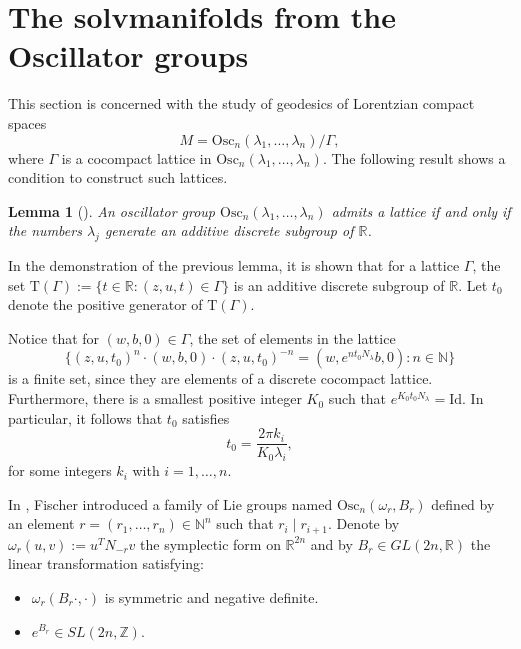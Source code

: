 \documentclass[12pt]{amsart}
\theoremstyle{plain}
\newtheorem{lem}[thm]{Lemma}
\theoremstyle{definition}
\theoremstyle{remark}
\begin{document}
	

	
\section{The solvmanifolds from the Oscillator groups}\label{sectionosc}

This section is concerned with the study of geodesics of Lorentzian compact spaces 
\[
M = \text{Osc}_n(\lambda_1, \ldots, \lambda_n) / \Gamma,
\]
where \( \Gamma \) is a cocompact lattice in \( \text{Osc}_n(\lambda_1, \ldots, \lambda_n) \). The following result shows a condition to construct such lattices.

\begin{lem}[\cite{MeRe}]\label{lema_medina}
    An oscillator group \( \text{Osc}_n(\lambda_1, \ldots, \lambda_n) \) admits a lattice if and only if the numbers \( \lambda_j \) generate an additive discrete subgroup of \( \mathbb{R} \).
\end{lem}

In the demonstration of the previous lemma, it is shown that for a lattice \( \Gamma \), the set \( \mathrm{T}(\Gamma) := \{ t \in \mathbb{R} : (z,u,t) \in \Gamma \} \) is an additive discrete subgroup of \( \mathbb{R} \). Let \( t_0 \) denote the positive generator of \( \mathrm{T}(\Gamma) \).

Notice that for \( (w,b,0) \in \Gamma \), the set of elements in the lattice
\[
\{ (z,u,t_0)^n \cdot (w,b,0) \cdot (z,u,t_0)^{-n} = (w,e^{n t_0 N_{\lambda}}b,0) : n \in \mathbb{N} \}
\]
is a finite set, since they are elements of a discrete cocompact lattice. Furthermore, there is a smallest positive integer \( K_0 \) such that \( e^{K_0 t_0 N_{\lambda}} = \text{Id} \). In particular, it follows that \( t_0 \) satisfies
\begin{equation}\label{oscilator-N}
    t_0 = \frac{2 \pi k_i}{K_0 \lambda_i},
\end{equation}
for some integers \( k_i \) with \( i = 1, \ldots, n \).

In \cite{MF}, Fischer introduced a family of Lie groups named \( \text{Osc}_n(\omega_r, B_r) \) defined by an element \( r = (r_1, \ldots, r_n) \in \mathbb{N}^n \) such that \( r_i \mid r_{i+1} \). Denote by \( \omega_r(u,v) := u^T N_{-r} v \) the symplectic form on \( \mathbb{R}^{2n} \) and by \( B_r \in GL(2n, \mathbb{R}) \) the linear transformation satisfying:

\begin{itemize}
    \item \( \omega_r(B_r \cdot, \cdot) \) is symmetric and negative definite.
    \item \( e^{B_r} \in SL(2n, \mathbb{Z}) \).
\end{itemize}
\end{document}
